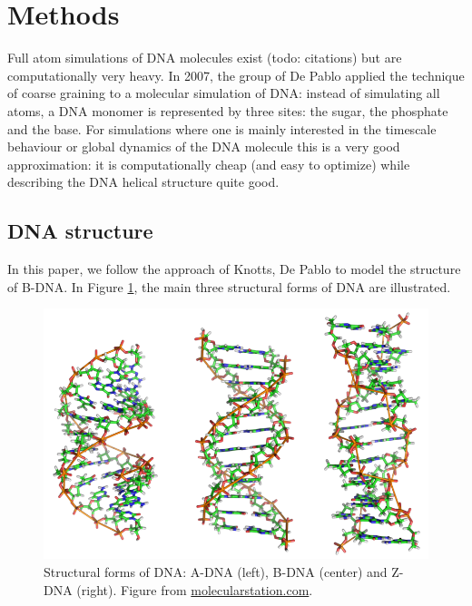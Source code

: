 \section{Methods}

Full atom simulations of DNA molecules exist (todo: citations) but are computationally very heavy. In 2007, the group of De Pablo \cite{knotts2007coarse} applied the technique of coarse graining to a molecular simulation of DNA: instead of simulating all atoms, a DNA monomer is represented by three sites: the sugar, the phosphate and the base. For simulations where one is mainly interested in the timescale behaviour or global dynamics of the DNA molecule this is a very good approximation: it is computationally cheap (and easy to optimize) while describing the DNA helical structure quite good. 

\subsection{DNA structure}

In this paper, we follow the approach of Knotts, De Pablo \etal \cite{knotts2007coarse} to model the structure of B-DNA. In Figure \ref{dna_forms}, the main three structural forms of DNA are illustrated.

\begin{figure}[htbp]
\begin{center}
\includegraphics[width=14cm]{images/dna_forms.png}
\caption{Structural forms of DNA: A-DNA (left), B-DNA (center) and Z-DNA (right). Figure from \href{http://www.molecularstation.com}{molecularstation.com}.}
\label{dna_forms}
\end{center}
\end{figure}


